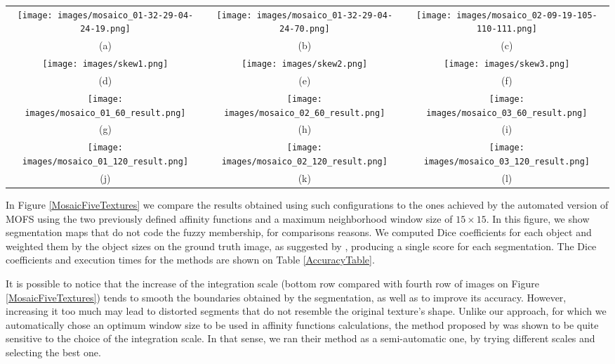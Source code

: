 \documentclass[10pt,twocolumn,letterpaper]{article}
\begin{document}
\setlength{\tabcolsep}{3pt}
\begin{figure*}
\begin{center}
\begin{tabular}{ccc}
\texttt{[image: images/mosaico\_01-32-29-04-24-19.png]}&
\texttt{[image: images/mosaico\_01-32-29-04-24-70.png]}&
\texttt{[image: images/mosaico\_02-09-19-105-110-111.png]}\\
(a)&(b)&(c)\\
\texttt{[image: images/skew1.png]}&
\texttt{[image: images/skew2.png]}&
\texttt{[image: images/skew3.png]}\\
(d)&(e)&(f)\\
\texttt{[image: images/mosaico\_01\_60\_result.png]}&
\texttt{[image: images/mosaico\_02\_60\_result.png]}&
\texttt{[image: images/mosaico\_03\_60\_result.png]}\\
(g)&(h)&(i)\\
\texttt{[image: images/mosaico\_01\_120\_result.png]}&
\texttt{[image: images/mosaico\_02\_120\_result.png]}&
\texttt{[image: images/mosaico\_03\_120\_result.png]}\\
(j)&(k)&(l)\\
\end{tabular}
\end{center}
\caption{Original mosaics produced by combining five Brodatz Textures (a), (b) and (c), and crisp segmentation maps for our proposed method (d), (e) and (f), for the method of \cite{YUAN15a} with integration scale of $60 \times 60$ (g), (h) and (i) and with integration scale of $60 \times 60$ (j), (k) and (l).}
\label{MosaicFiveTextures}
\end{figure*}

In Figure \ref{MosaicFiveTextures} we compare the results obtained using such configurations to the ones achieved by the automated version of MOFS using the two previously defined affinity functions and a maximum neighborhood window size of $15 \times 15$. In this figure, we show segmentation maps that do not code the fuzzy membership, for comparisons reasons. We computed Dice coefficients \cite{DICE45a} for each object and weighted them by the object sizes on the ground truth image, as suggested by \cite{CRUM06a}, producing a single score for each segmentation. The Dice coefficients and execution times for the methods are shown on Table \ref{AccuracyTable}. 

It is possible to notice that the increase of the integration scale (bottom row compared with fourth row of images on Figure \ref{MosaicFiveTextures}) tends to smooth the boundaries obtained by the segmentation, as well as to improve its accuracy. However, increasing it too much may lead to distorted segments that do not resemble the original texture's shape. Unlike our approach, for which we automatically chose an optimum window size to be used in affinity functions calculations, the method proposed by \cite{YUAN15a} was shown to be quite sensitive to the choice of the integration scale. In that sense, we ran their method as a semi-automatic one, by trying different scales and selecting the best one.
\end{document}
